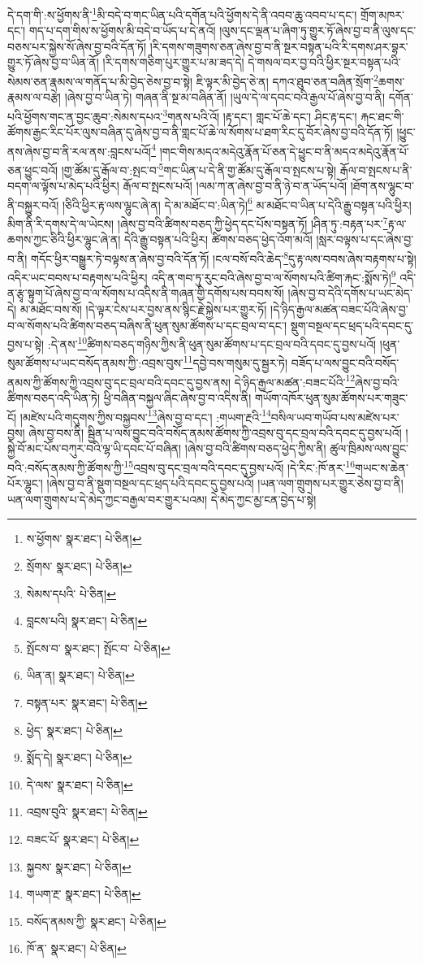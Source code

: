 དེ་དག་གི་:ས་ཕྱོགས་ནི་\footnote{ས་ཕྱོགས་  སྣར་ཐང་།  པེ་ཅིན། }མི་བདེ་བ་གང་ཡིན་པའི་དགོན་པའི་ཕྱོགས་དེ་ནི་འབབ་ཆུ་འབབ་པ་དང་། གྲོག་མཁར་དང་། གད་པ་དག་གིས་ས་ཕྱོགས་མི་བདེ་བ་ཡོད་པ་དེ་ནའོ། །ལུས་དང་ལྡན་པ་ཞིག་ཏུ་གྱུར་ཏོ་ཞེས་བྱ་བ་ནི་ལུས་དང་བཅས་པར་སྐྱེས་སོ་ཞེས་བྱ་བའི་དོན་ཏོ། །རི་དགས་གཟུགས་ཅན་ཞེས་བྱ་བ་ནི་སྔར་བསྟན་པའི་རི་དགས་ཤར་བྷར་གྱུར་ཏོ་ཞེས་བྱ་བ་ཡིན་ནོ། །རི་དགས་གཅིག་པུར་གྱུར་པ་མ་ཟད་དེ། དེ་གསལ་བར་བྱ་བའི་ཕྱིར་སྔར་བསྟན་པའི་སེམས་ཅན་རྣམས་ལ་གནོད་པ་མི་བྱེད་ཅེས་བྱ་བ་སྟེ། ཇི་ལྟར་མི་བྱེད་ཅེ་ན། དཀའ་ཐུབ་ཅན་བཞིན་སྲོག་\footnote{སྲོགས་  སྣར་ཐང་།  པེ་ཅིན། }ཆགས་རྣམས་ལ་བརྩེ། །ཞེས་བྱ་བ་ཡིན་ཏེ། གཞན་ནི་སྔ་མ་བཞིན་ནོ། །ཡུལ་དེ་ལ་དབང་བའི་རྒྱལ་པོ་ཞེས་བྱ་བ་ནི། དགོན་པའི་ཕྱོགས་གང་ན་བྱང་ཆུབ་:སེམས་དཔའ་\footnote{སེམས་དཔའི་  པེ་ཅིན། }གནས་པའི་འོ། །རྟ་དང་། གླང་པོ་ཆེ་དང་། ཤིང་རྟ་དང་། རྐང་ཐང་གི་ཚོགས་རྒྱང་རིང་པོར་ལུས་བཞིན་དུ་ཞེས་བྱ་བ་ནི་གླང་པོ་ཆེ་ལ་སོགས་པ་ཐག་རིང་དུ་བོར་ཞེས་བྱ་བའི་དོན་ཏོ། །ཕྱུང་ནས་ཞེས་བྱ་བ་ནི་རལ་ནས་:བླངས་པའོ།\footnote{བླངས་པའི།  སྣར་ཐང་།  པེ་ཅིན། } །གང་གིས་མདའ་མདེའུ་རྣོན་པོ་ཅན་དེ་ཕྱུང་བ་ནི་མདའ་མདེའུ་རྣོན་པོ་ཅན་ཕྱུང་བའོ། །གྱ་ཚོམ་དུ་རྒོལ་བ་:སྤང་བ་\footnote{སྤོངས་བ་  སྣར་ཐང་། སྤོང་བ་  པེ་ཅིན། }གང་ཡིན་པ་དེ་ནི་གྱ་ཚོམ་དུ་རྒོལ་བ་སྤངས་པ་སྟེ། རྒོལ་བ་སྤངས་པ་ནི་བདག་ལ་ལྟོས་པ་མེད་པའི་ཕྱིར། རྒོལ་བ་སྤངས་པའོ། །ལམ་ཀ་ན་ཞེས་བྱ་བ་ནི་ཉེ་བ་ན་ཡོད་པའོ། །ཐོག་ནས་ལྷུང་བ་ནི་བསྐྱུར་བའོ། །ཅིའི་ཕྱིར་རྟ་ལས་ལྷུང་ཞེ་ན། དེ་མ་མཐོང་བ་:ཡིན་ཏེ།\footnote{ཡིན་ན།  སྣར་ཐང་།  པེ་ཅིན། } མ་མཐོང་བ་ཡིན་པ་དེའི་རྒྱུ་བསྟན་པའི་ཕྱིར། མིག་ནི་རི་དགས་དེ་ལ་ཡེངས། །ཞེས་བྱ་བའི་ཚིགས་བཅད་ཀྱི་ཕྱེད་དང་པོས་བསྟན་ཏོ། །ཤིན་ཏུ་:བརྟན་པར་\footnote{བསྟན་པར་  སྣར་ཐང་།  པེ་ཅིན། }རྟ་ལ་ཆགས་ཀྱང་ཅིའི་ཕྱིར་ལྷུང་ཞེ་ན། དེའི་རྒྱུ་བསྟན་པའི་ཕྱིར། ཚིགས་བཅད་ཕྱེད་འོག་མའོ། །སླར་བལྟས་པ་དང་ཞེས་བྱ་བ་ནི། གདོང་ཕྱིར་བསྒྱུར་ཏེ་བལྟས་ན་ཞེས་བྱ་བའི་དོན་ཏོ། །ངལ་བསོ་བའི་ཆེད་\footnote{ཕྱེད་  སྣར་ཐང་།  པེ་ཅིན། }དུ་རྟ་ལས་བབས་ཞེས་བརྟགས་པ་སྟེ། འདིར་ཡང་བབས་པ་བརྟགས་པའི་ཕྱིར། འདི་ན་གབ་ཏུ་རུང་བའི་ཞེས་བྱ་བ་ལ་སོགས་པའི་ཚིག་རྐང་:སྨོས་ཏེ།\footnote{སྨོད་དེ།  སྣར་ཐང་།  པེ་ཅིན། } འདི་ན་རྩྭ་སྟུག་པོ་ཞེས་བྱ་བ་ལ་སོགས་པ་འདིས་ནི་གཞན་གྱི་དགོས་པས་བབས་སོ། །ཞེས་བྱ་བ་དེའི་དགོས་པ་ཡང་མེད་དེ། མ་མཐོང་བས་སོ། །དེ་ལྟར་ངེས་པར་བྱས་ནས་སྙིང་རྗེ་སྐྱེས་པར་གྱུར་ཏོ། །དེ་ཉིད་རྒྱལ་མཚན་བཟང་པོའི་ཞེས་བྱ་བ་ལ་སོགས་པའི་ཚིགས་བཅད་བཞིས་ནི་ཕུན་སུམ་ཚོགས་པ་དང་བྲལ་བ་དང་། སྡུག་བསྔལ་དང་ཕྲད་པའི་དབང་དུ་བྱས་པ་སྟེ། :དེ་ནས་\footnote{དེ་ལས་  སྣར་ཐང་།  པེ་ཅིན། }ཚིགས་བཅད་གཉིས་ཀྱིས་ནི་ཕུན་སུམ་ཚོགས་པ་དང་བྲལ་བའི་དབང་དུ་བྱས་པའོ། །ཕུན་སུམ་ཚོགས་པ་ཡང་བསོད་ནམས་ཀྱི་:འབྲས་བུས་\footnote{འབྲས་བུའི་  སྣར་ཐང་།  པེ་ཅིན། }དབྱེ་བས་གསུམ་དུ་སྦྱར་ཏེ། བཟོད་པ་ལས་བྱུང་བའི་བསོད་ནམས་ཀྱི་ཚོགས་ཀྱི་འབྲས་བུ་དང་བྲལ་བའི་དབང་དུ་བྱས་ནས། དེ་ཉིད་རྒྱལ་མཚན་:བཟང་པོའི་\footnote{བཟང་པོ་  སྣར་ཐང་།  པེ་ཅིན། }ཞེས་བྱ་བའི་ཚིགས་བཅད་འདི་ཡིན་ཏེ། ཕྱི་བཞིན་བསྐྱལ་ཞིང་ཞེས་བྱ་བ་འདིས་ནི། གཡོག་འཁོར་ཕུན་སུམ་ཚོགས་པར་གཟུང་ངོ། །མཛེས་པའི་གདུགས་ཀྱིས་བསྐྱབས་\footnote{སྐྱབས་  སྣར་ཐང་།  པེ་ཅིན། }ཞེས་བྱ་བ་དང་། :གཡག་རྔའི་\footnote{གཡག་རྔ་  སྣར་ཐང་།  པེ་ཅིན། }བསིལ་ཡབ་གཡོབ་པས་མཛེས་པར་བྱས། ཞེས་བྱ་བས་ནི། སྦྱིན་པ་ལས་བྱུང་བའི་བསོད་ནམས་ཚོགས་ཀྱི་འབྲས་བུ་དང་བྲལ་བའི་དབང་དུ་བྱས་པའོ། །སྐྱེ་བོ་མང་པོས་བཀུར་བའི་ལྷ་ཡི་དབང་པོ་བཞིན། །ཞེས་བྱ་བའི་ཚིགས་བཅད་ཕྱེད་ཀྱིས་ནི། ཚུལ་ཁྲིམས་ལས་བྱུང་བའི་:བསོད་ནམས་ཀྱི་ཚོགས་ཀྱི་\footnote{བསོད་ནམས་ཀྱི་  སྣར་ཐང་།  པེ་ཅིན། }འབྲས་བུ་དང་བྲལ་བའི་དབང་དུ་བྱས་པའོ། །དེ་རིང་:ཁོ་ནར་\footnote{ཁོ་ན་  སྣར་ཐང་།  པེ་ཅིན། }གཡང་ས་ཆེན་པོར་ལྷུང་། །ཞེས་བྱ་བ་ནི་སྡུག་བསྔལ་དང་ཕྲད་པའི་དབང་དུ་བྱས་པའོ། །ཡན་ལག་གྲུགས་པར་གྱུར་ཅེས་བྱ་བ་ནི། ཡན་ལག་གྲུགས་པ་དེ་མེད་ཀྱང་བརྒྱལ་བར་གྱུར་པའམ། དེ་མེད་ཀྱང་མྱ་ངན་བྱེད་པ་སྟེ། 